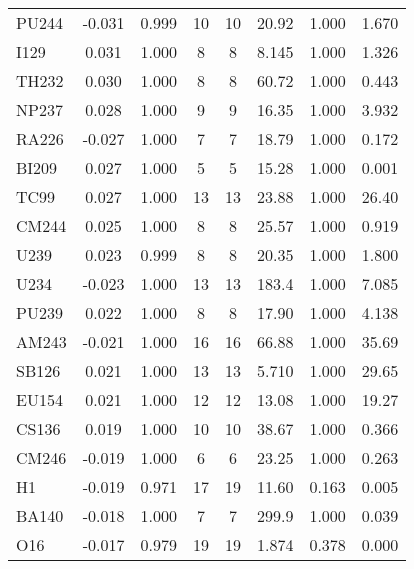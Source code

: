 \begin{tabular}{|l|ccccccc|}
PU244 & -0.031 & 0.999 & 10 & 10 & 20.92 & 1.000 & 1.670\\
I129 & 0.031 & 1.000 & 8 & 8 & 8.145 & 1.000 & 1.326\\
TH232 & 0.030 & 1.000 & 8 & 8 & 60.72 & 1.000 & 0.443\\
NP237 & 0.028 & 1.000 & 9 & 9 & 16.35 & 1.000 & 3.932\\
RA226 & -0.027 & 1.000 & 7 & 7 & 18.79 & 1.000 & 0.172\\
BI209 & 0.027 & 1.000 & 5 & 5 & 15.28 & 1.000 & 0.001\\
TC99 & 0.027 & 1.000 & 13 & 13 & 23.88 & 1.000 & 26.40\\
CM244 & 0.025 & 1.000 & 8 & 8 & 25.57 & 1.000 & 0.919\\
U239 & 0.023 & 0.999 & 8 & 8 & 20.35 & 1.000 & 1.800\\
U234 & -0.023 & 1.000 & 13 & 13 & 183.4 & 1.000 & 7.085\\
PU239 & 0.022 & 1.000 & 8 & 8 & 17.90 & 1.000 & 4.138\\
AM243 & -0.021 & 1.000 & 16 & 16 & 66.88 & 1.000 & 35.69\\
SB126 & 0.021 & 1.000 & 13 & 13 & 5.710 & 1.000 & 29.65\\
EU154 & 0.021 & 1.000 & 12 & 12 & 13.08 & 1.000 & 19.27\\
CS136 & 0.019 & 1.000 & 10 & 10 & 38.67 & 1.000 & 0.366\\
CM246 & -0.019 & 1.000 & 6 & 6 & 23.25 & 1.000 & 0.263\\
H1 & -0.019 & 0.971 & 17 & 19 & 11.60 & 0.163 & 0.005\\
BA140 & -0.018 & 1.000 & 7 & 7 & 299.9 & 1.000 & 0.039\\
O16 & -0.017 & 0.979 & 19 & 19 & 1.874 & 0.378 & 0.000\\
\hline
\end{tabular}
